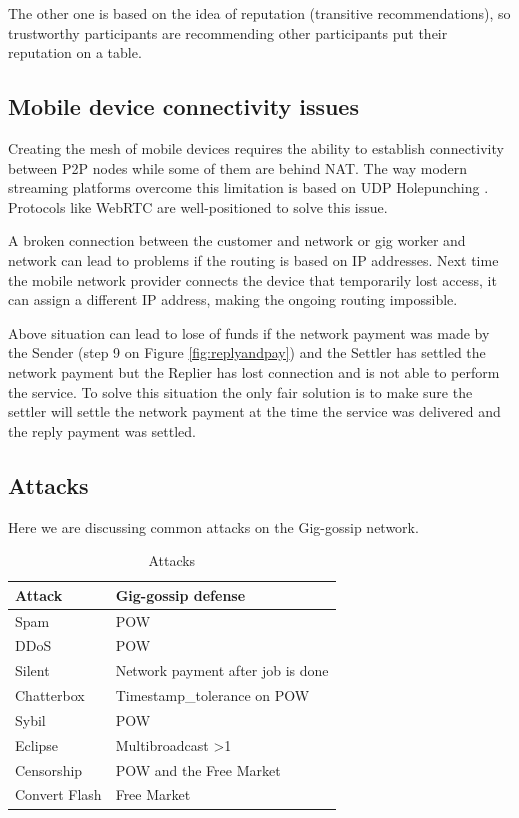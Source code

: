 \documentclass{article}
\begin{document}
The other one is based on the idea of reputation (transitive recommendations), so trustworthy participants are recommending other participants put their reputation on a table.

\subsection{Mobile device connectivity issues}
\label{mobdev}

Creating the mesh of mobile devices requires the ability to establish connectivity between P2P nodes while some of them are behind NAT. The way modern streaming platforms overcome this limitation is based on UDP Holepunching \cite{HolePunching}. Protocols like WebRTC \cite{WebRTC} are well-positioned to solve this issue.

A broken connection between the customer and network or gig worker and network can lead to problems if the routing is based on IP addresses. Next time the mobile network provider connects the device that temporarily lost access, it can assign a different IP address, making the ongoing routing impossible.

Above situation can lead to lose of funds if the network payment was made by the Sender (step 9 on Figure \ref{fig:replyandpay}) and the Settler has settled the network payment but the Replier has lost connection and is not able to perform the service. To solve this situation the only fair solution is to make sure the settler will settle the network payment at the time the service was delivered and the reply payment was settled.

\subsection{Attacks}
Here we are discussing common attacks on the Gig-gossip network.


\begin{table}  
	\centering
	\begin{tabular}{ll}
		\toprule
		Attack         & Gig-gossip defense \\
		\midrule
		Spam           & POW \\
		DDoS           & POW \\
		Silent         & Network payment after job is done \\
		Chatterbox     & Timestamp\_tolerance on POW\\
		Sybil          & POW \\
		Eclipse        & Multibroadcast >1 \\
		Censorship     & POW and the Free Market \\
		Convert Flash  & Free Market \\
		\bottomrule
	\end{tabular}
	\label{tab:attacks}
	\caption{Attacks}
\end{table}
\end{document}
